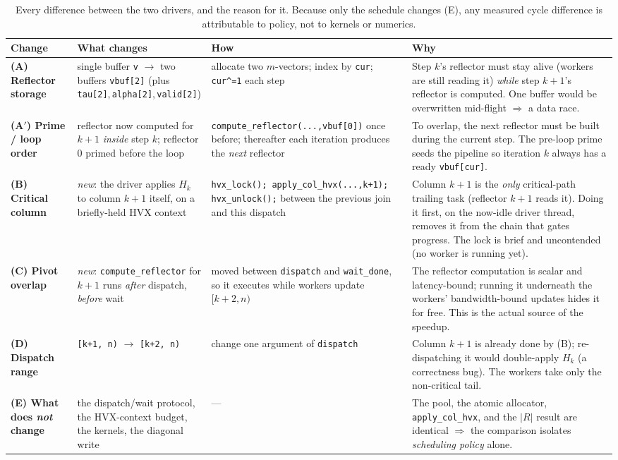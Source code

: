 \documentclass[11pt]{article}
\newcommand{\code}[1]{\texttt{\small #1}}
\begin{document}
\begin{table}[h]
\centering\small
\renewcommand{\arraystretch}{1.35}
\begin{tabular}{@{}p{2.2cm}p{3.4cm}p{3.4cm}p{4.6cm}@{}}
\toprule
\textbf{Change} & \textbf{What changes} & \textbf{How} & \textbf{Why} \\
\midrule
\textbf{(A) Reflector storage} &
single buffer \code{v} $\to$ two buffers \code{vbuf[2]} (plus \code{tau[2]},\,\code{alpha[2]},\,\code{valid[2]}) &
allocate two $m$-vectors; index by \code{cur}; \code{cur\^{}=1} each step &
Step $k$'s reflector must stay alive (workers are still reading it) \emph{while} step $k{+}1$'s reflector is computed. One buffer would be overwritten mid-flight $\Rightarrow$ a data race. \\
\midrule
\textbf{(A$'$) Prime / loop order} &
reflector now computed for $k{+}1$ \emph{inside} step $k$; reflector $0$ primed before the loop &
\code{compute\_reflector(...,vbuf[0])} once before; thereafter each iteration produces the \emph{next} reflector &
To overlap, the next reflector must be built during the current step. The pre-loop prime seeds the pipeline so iteration $k$ always has a ready \code{vbuf[cur]}. \\
\midrule
\textbf{(B) Critical column} &
\emph{new}: the driver applies $H_k$ to column $k{+}1$ itself, on a briefly-held HVX context &
\code{hvx\_lock(); apply\_col\_hvx(...,k+1); hvx\_unlock();} between the previous join and this dispatch &
Column $k{+}1$ is the \emph{only} critical-path trailing task (reflector $k{+}1$ reads it). Doing it first, on the now-idle driver thread, removes it from the chain that gates progress. The lock is brief and uncontended (no worker is running yet). \\
\midrule
\textbf{(C) Pivot overlap} &
\emph{new}: \code{compute\_reflector} for $k{+}1$ runs \emph{after} dispatch, \emph{before} wait &
moved between \code{dispatch} and \code{wait\_done}, so it executes while workers update $[k{+}2,n)$ &
The reflector computation is scalar and latency-bound; running it underneath the workers' bandwidth-bound updates hides it for free. This is the actual source of the speedup. \\
\midrule
\textbf{(D) Dispatch range} &
\code{[k+1, n)} $\to$ \code{[k+2, n)} &
change one argument of \code{dispatch} &
Column $k{+}1$ is already done by (B); re-dispatching it would double-apply $H_k$ (a correctness bug). The workers take only the non-critical tail. \\
\midrule
\textbf{(E) What does \emph{not} change} &
the dispatch/wait protocol, the HVX-context budget, the kernels, the diagonal write &
--- &
The pool, the atomic allocator, \code{apply\_col\_hvx}, and the $\lvert R\rvert$ result are identical $\Rightarrow$ the comparison isolates \emph{scheduling policy} alone. \\
\bottomrule
\end{tabular}
\caption{Every difference between the two drivers, and the reason for it. Because only
the schedule changes (E), any measured cycle difference is attributable to policy, not
to kernels or numerics.}
\end{table}
\end{document}
